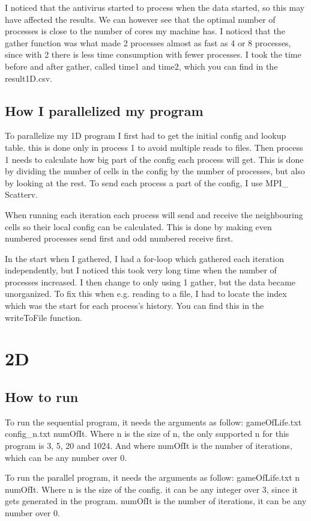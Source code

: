 \documentclass[a4paper]{extarticle}
\begin{document}
I noticed that the antivirus started to process when the data started, so this may have affected the results.
We can however see that the optimal number of processes is close to the number of cores my machine has. I noticed that the gather function was what made 2 processes almost as fast as 4 or 8 processes, since with 2 there is less time consumption with fewer processes. I took the time before and after gather, called time1 and time2, which you can find in the result1D.csv.

\subsection{How I parallelized my program}
To parallelize my 1D program I first had to get the initial config and lookup table. this is done only in process 1 to avoid multiple reads to files. Then process 1 needs to calculate how big part of the config each process will get. This is done by dividing the number of cells in the config by the number of processes, but also by looking at the rest. To send each process a part of the config, I use MPI\_ Scatterv.

When running each iteration each process will send and receive the neighbouring cells so their local config can  be calculated. This is done by making even numbered processes send first and odd numbered receive first.

In the start when I gathered, I had a for-loop which gathered each iteration independently, but I noticed this took very long time when the number of processes increased. I then change to only using 1 gather, but the data became unorganized. To fix this when e.g. reading to a file, I had to locate the index which was the start for each process's history. You can find this in the writeToFile function.

\section{2D}
\subsection{How to run}
To run the sequential program, it needs the arguments as follow: gameOfLife.txt config\_n.txt numOfIt. Where n is the size of n, the only supported n for this program is 3, 5, 20 and 1024. And where numOfIt is the number of iterations, which can be any number over 0.

To run the parallel program, it needs the arguments as follow: gameOfLife.txt n numOfIt. Where n is the size of the config. it can be any integer over 3, since it gets generated in the program. numOfIt is the number of iterations, it can be any number over 0. 
\end{document}
